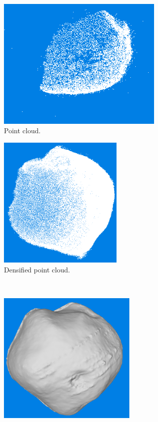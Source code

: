 \begin{figure}[htb]
    \centering
    \begin{subfigure}[b]{0.46\textwidth}
        \centering
        \includegraphics[width=\textwidth,height=6.4cm]{doc/thesis/0_figures/models_quality/100_1/120_100_1_points2.png}
        \caption{Point cloud.}
        \label{fig:recon_step_point}
    \end{subfigure}
    \begin{subfigure}[b]{0.46\textwidth}
        \centering
        \includegraphics[width=\textwidth,height=6.4cm]{doc/thesis/0_figures/models_quality/100_1/120_100_1_dense1.png}
        \caption{Densified point cloud.}
        \label{fig:recon_step_dense}
    \end{subfigure}
    \\
    \begin{subfigure}[b]{0.46\textwidth}
        \centering
        \includegraphics[width=\textwidth,height=6.4cm]{doc/thesis/0_figures/models_quality/100_1/120_100_1_mesh1.png}

\end{subfigure}
\end{figure}
